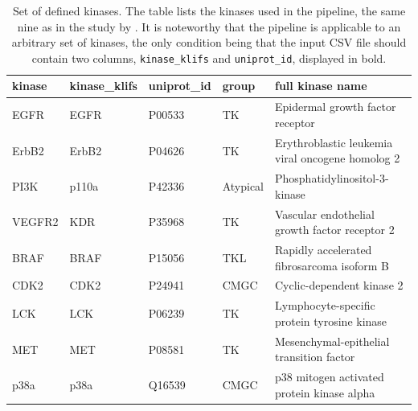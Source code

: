 \documentclass[9pt,training,ASAPversion]{livecoms}
\begin{document}
\begin{table}
\centering
\begin{tabular}{lllll}
\hline
kinase & \textbf{kinase\_klifs} & \textbf{uniprot\_id} & group    & full kinase name                               \\
\hline
\hline
EGFR   & EGFR          & P00533      & TK       & Epidermal growth factor receptor                 \\
ErbB2  & ErbB2         & P04626      & TK       & Erythroblastic leukemia viral oncogene homolog 2 \\
PI3K   & p110a         & P42336      & Atypical & Phosphatidylinositol-3-kinase                    \\
VEGFR2 & KDR           & P35968      & TK       & Vascular endothelial growth factor receptor 2    \\
BRAF   & BRAF          & P15056      & TKL      & Rapidly accelerated fibrosarcoma isoform B       \\
CDK2   & CDK2          & P24941      & CMGC     & Cyclic-dependent kinase 2                        \\
LCK    & LCK           & P06239      & TK       & Lymphocyte-specific protein tyrosine kinase      \\
MET    & MET           & P08581      & TK       & Mesenchymal-epithelial transition factor         \\
p38a   & p38a          & Q16539      & CMGC     & p38 mitogen activated protein kinase alpha      \\
\hline
\end{tabular}
    \caption{Set of defined kinases. The table lists the kinases used in the pipeline, the same nine as in the study by \citet{Schmidt_2021_molecules}. It is noteworthy that the pipeline is applicable to an arbitrary set of kinases, the only condition being that the input CSV file should contain two columns, \texttt{kinase\_klifs} and \texttt{uniprot\_id}, displayed in bold.}
    \label{tab:kinase_selection}
\end{table}
\end{document}
